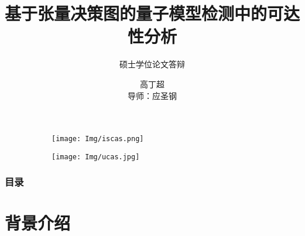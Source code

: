 \documentclass[aspectratio=1610]{ctexbeamer}
\title[学位论文答辩]{基于张量决策图的量子模型检测中的可达性分析}
\subtitle{硕士学位论文答辩}
\author[Gc]{高丁超\\ 导师：应圣钢}
\institute[ISCAS]{中国科学院软件研究所}
\begin{document}
\begin{frame}[plain]
    \titlepage
    \begin{figure}
        \centering
        \begin{subfigure}[c]{0.4\textwidth}
            \centering
            \texttt{[image: Img/iscas.png]}
        \end{subfigure}
        \qquad
        \begin{subfigure}[c]{0.4\textwidth}
            \centering
            \texttt{[image: Img/ucas.jpg]}
        \end{subfigure}
    \end{figure}
\end{frame}
\begin{frame}
    \frametitle{目录}
    \tableofcontents
\end{frame}

\section{背景介绍}
\end{document}
